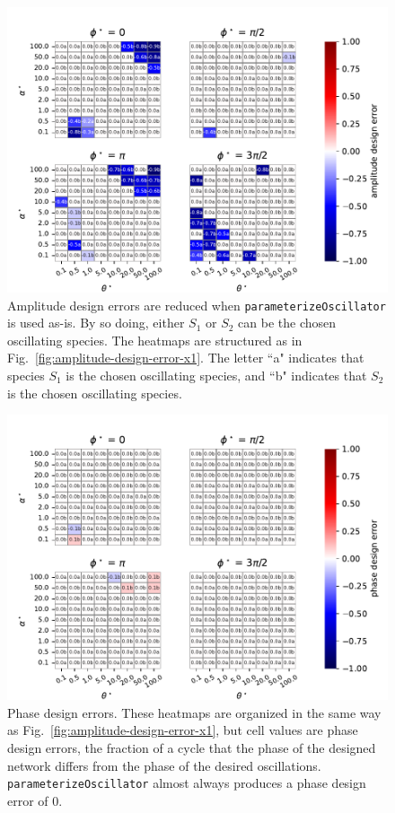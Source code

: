 \documentclass{bmcart}
\newcommand{\fig}[1]{Fig.~\ref{#1}}
\begin{document}
\begin{backmatter}
\begin{figure}
        \centering
         \includegraphics[scale=0.75]{figures/Figure_5.pdf}
         \caption[]{Amplitude design errors are reduced when {\tt parameterizeOscillator} is used as-is. By so doing, either $S_1$ or $S_2$ can be the chosen oscillating species. The heatmaps are structured as in \fig{fig:amplitude-design-error-x1}. The letter ``a" indicates that species $S_1$ is the chosen oscillating species, and ``b" indicates that $S_2$ is the chosen oscillating species.} 
         \label{fig:amplitude-design-error-both}
\end{figure}


\begin{figure}
        \centering
         \includegraphics[scale=0.75]{figures/Figure_6.pdf}
         \caption[]{Phase design errors. These heatmaps are organized in the same way as \fig{fig:amplitude-design-error-x1}, but cell values are phase design errors, the fraction of a cycle that the phase of the designed network differs from the phase of the desired oscillations. {\tt parameterizeOscillator} almost always produces a phase design error of 0.} 
         \label{fig:phase-design-error-both}
\end{figure}



\end{backmatter}
\end{document}
